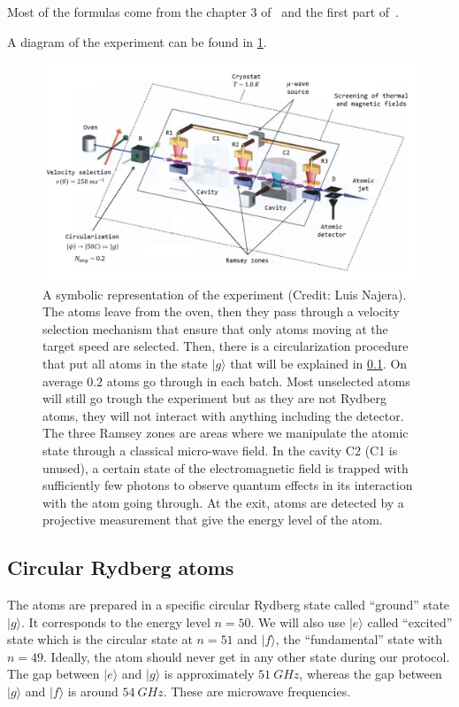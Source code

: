 \documentclass[10pt,a4paper]{report}
\theoremstyle{plain}
\theoremstyle{definition}
\theoremstyle{remark}
\newcommand{\ket}[1]{|#1\rangle}
\begin{document}
Most of the formulas come from the chapter 3 of~\cite{Har06} and the first part
of~\cite{SayPHD11}.

A diagram of the experiment can be found in \cref{fig:exp}.

\begin{figure}[h]
  \includegraphics[width=\textwidth]{exp.png}
  \caption{A symbolic representation of the experiment (Credit: Luis Najera).
    The atoms leave from the oven, then they pass through a velocity selection
    mechanism that ensure that only atoms moving at the target speed are selected.
    Then, there is a circularization procedure that put all atoms in the state
    $\ket g$ that will be explained in \cref{ssec:atoms}. On average $0.2$ atoms
    go through in each batch. Most unselected atoms
    will still go trough the experiment but as they are not Rydberg atoms, they
    will not interact with anything including the detector. The three Ramsey
    zones are areas where we manipulate the atomic state through a classical
    micro-wave field. In the cavity C2 (C1 is unused), a certain state of the
    electromagnetic field is trapped with sufficiently few photons to observe
    quantum effects in its interaction with the atom going through.
    At the exit, atoms are detected by a projective measurement
    that give the energy level of the atom.}
  \label{fig:exp}
\end{figure}


\subsection{Circular Rydberg atoms}\label{ssec:atoms}


The atoms are prepared in a specific circular Rydberg state called ``ground'' state
$\ket g$. It corresponds to the energy level $n = 50$. We will also use $\ket e$
called ``excited'' state which is the circular state at $n = 51$ and $\ket f$, the
``fundamental'' state with $n = 49$. Ideally, the atom should never get
in any other state during our protocol.
The gap between $\ket e$ and $\ket g$ is
approximately $\SI{51}{GHz}$, whereas the gap between $\ket g$ and $\ket f$ is
around $\SI{54}{GHz}$. These are microwave frequencies.
\end{document}
